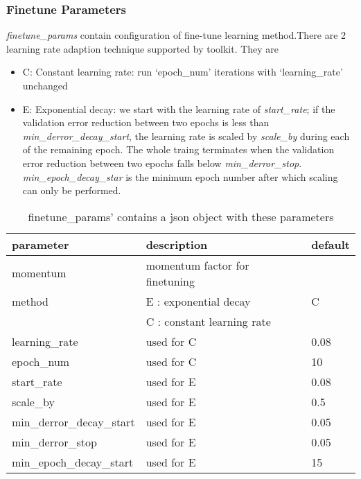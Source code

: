 \subsubsection{Finetune Parameters}
\label{subsec:finetuneparam}
\emph{finetune\_params} contain configuration of fine-tune learning method.There are 2 learning rate adaption technique supported by toolkit. They are
\begin{itemize}
\item C: Constant learning rate: run `epoch\_num' iterations with `learning\_rate' unchanged
\item E: Exponential decay: we start with the learning rate of \emph{start\_rate}; if the validation error reduction between two epochs is less than \emph{min\_derror\_decay\_start}, the learning rate is scaled by \emph{scale\_by} during each of the remaining epoch. The whole traing terminates when the validation error reduction between two epochs falls below \emph{min\_derror\_stop}. \emph{min\_epoch\_decay\_star} is the minimum epoch number after which scaling can only be performed.
\end{itemize}
\begin{table}[h]
\centering
\begin{tabular}{|l|l|l|}
\hline
\textbf{parameter}	& \textbf{description} 				& \textbf{default}\\  \hline
momentum 			& momentum factor for finetuning 	& \\
method 				& E : exponential decay 			& C\\
					& C : constant learning rate 		& \\
learning\_rate   	& used for C 						& 0.08\\
epoch\_num          & used for C 			 			& 10\\
start\_rate         & used for E 						& 0.08 \\
scale\_by           & used for E 						& 0.5\\
min\_derror\_decay\_start& used for E 					& 0.05\\
min\_derror\_stop   & used for E 						& 0.05 \\
min\_epoch\_decay\_start  & used for E 					& 15\\
\hline
\end{tabular}
\caption[]{finetune\_params' contains a json object with these parameters}
\end{table}

\clearpage


